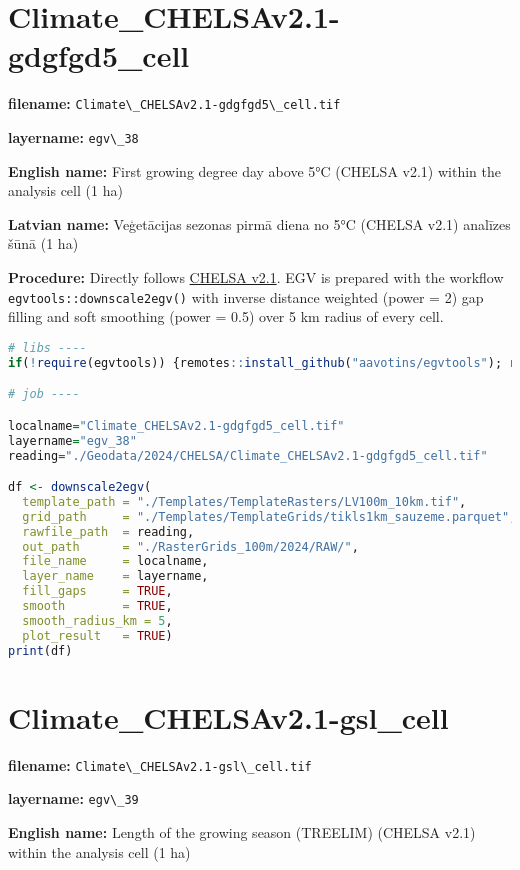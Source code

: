 \documentclass[
]{book}
\newcommand{\passthrough}[1]{#1}
\begin{document}
\section{Climate\_CHELSAv2.1-gdgfgd5\_cell}\label{ch06.038}

\textbf{filename:} \passthrough{\lstinline!Climate\_CHELSAv2.1-gdgfgd5\_cell.tif!}

\textbf{layername:} \passthrough{\lstinline!egv\_38!}

\textbf{English name:} First growing degree day above 5°C (CHELSA v2.1) within the analysis cell (1 ha)

\textbf{Latvian name:} Veģetācijas sezonas pirmā diena no 5°C (CHELSA v2.1) analīzes šūnā (1 ha)

\textbf{Procedure:} Directly follows \hyperref[Ch04.11]{CHELSA v2.1}. EGV is prepared with the
workflow \passthrough{\lstinline!egvtools::downscale2egv()!} with inverse distance weighted (power = 2)
gap filling and soft smoothing (power = 0.5) over 5 km radius of every cell.

\begin{lstlisting}[language=R]
# libs ----
if(!require(egvtools)) {remotes::install_github("aavotins/egvtools"); require(egvtools)}

# job ----

localname="Climate_CHELSAv2.1-gdgfgd5_cell.tif"
layername="egv_38"
reading="./Geodata/2024/CHELSA/Climate_CHELSAv2.1-gdgfgd5_cell.tif"

df <- downscale2egv(
  template_path = "./Templates/TemplateRasters/LV100m_10km.tif",
  grid_path     = "./Templates/TemplateGrids/tikls1km_sauzeme.parquet",
  rawfile_path  = reading,
  out_path      = "./RasterGrids_100m/2024/RAW/",
  file_name     = localname,
  layer_name    = layername,
  fill_gaps     = TRUE,
  smooth        = TRUE,
  smooth_radius_km = 5,
  plot_result   = TRUE)
print(df)
\end{lstlisting}

\section{Climate\_CHELSAv2.1-gsl\_cell}\label{ch06.039}

\textbf{filename:} \passthrough{\lstinline!Climate\_CHELSAv2.1-gsl\_cell.tif!}

\textbf{layername:} \passthrough{\lstinline!egv\_39!}

\textbf{English name:} Length of the growing season (TREELIM) (CHELSA v2.1) within the analysis cell (1 ha)
\end{document}
